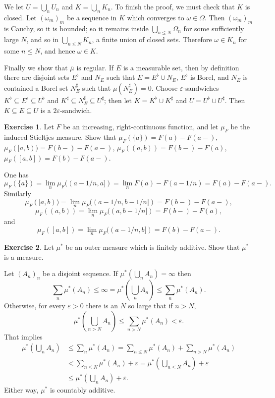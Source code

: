 \documentclass[10pt]{article}
\theoremstyle{definition}
\newtheorem{exer}{Exercise}
\begin{document}
We let $U = \bigcup_n U_n$ and $K = \bigcup_n K_n$. To finish the proof, we must check that $K$ is closed.
Let $(\omega_m)_m$ be a sequence in $K$ which converges to $\omega \in \Omega$.
Then $(\omega_m)_m$ is Cauchy, so it is bounded; so it remains inside $\bigcup_{n \leq N} \Omega_n$ for some sufficiently large $N$, and so in $\bigcup_{n \leq N} K_n$, a finite union of closed sets.
Therefore $\omega \in K_n$ for some $n \leq N$, and hence $\omega \in K$.

Finally we show that $\overline \mu$ is regular.
If $E$ is a measurable set, then by definition there are disjoint sets $E^\flat$ and $N_E$ such that $E = E^\flat \cup N_E$, $E^\flat$ is Borel, and $N_E$ is contained a Borel set $N_E^\sharp$ such that $\mu(N_E^\sharp) = 0$.
Choose $\varepsilon$-sandwiches $K^\flat \subseteq E^\flat \subseteq U^\flat$ and $K^\sharp \subseteq N_E^\sharp \subseteq U^\sharp$; then let $K = K^\flat \cup K^\sharp$ and $U = U^\flat \cup U^\sharp$.
Then $K \subseteq E \subseteq U$ is a $2\varepsilon$-sandwich.

\begin{exer}
Let $F$ be an increasing, right-continuous function, and let $\mu_F$ be the induced Stieltjes measure. Show that $\mu_F(\{a\}) = F(a) - F(a-)$, $\mu_F([a, b)) = F(b-) - F(a-)$, $\mu_F((a,b)) = F(b-) - F(a)$, $\mu_F([a,b]) = F(b) - F(a-)$.
\end{exer}

One has
$$\mu_F(\{a\}) = \lim_n \mu_F((a-1/n,a]) = \lim_n F(a) - F(a-1/n) = F(a) - F(a-).$$
Similarly
$$\mu_F([a, b)) = \lim_n \mu_F((a-1/n,b-1/n]) = F(b-) - F(a-),$$
$$\mu_F((a,b)) = \lim_n \mu_F((a, b-1/n]) = F(b-) - F(a),$$
and
$$\mu_F([a,b]) = \lim_n \mu_F((a-1/n,b]) = F(b) - F(a-).$$

\begin{exer}
Let $\mu^*$ be an outer measure which is finitely additive. Show that $\mu^*$ is a measure.
\end{exer}

Let $(A_n)_n$ be a disjoint sequence. If $\mu^*(\bigcup_n A_n) = \infty$ then
$$\sum_n \mu^*(A_n) \leq \infty = \mu^*\left(\bigcup_n A_n\right) \leq \sum_n \mu^*(A_n).$$
Otherwise, for every $\varepsilon > 0$ there is an $N$ so large that if $n > N$,
$$ \mu^*\left(\bigcup_{n > N} A_n \right) \leq \sum_{n > N} \mu^*(A_n) < \varepsilon.$$
That implies
\begin{align*}
 \mu^*\left(\bigcup_n A_n\right) &\leq \sum_n \mu^*(A_n) = \sum_{n \leq N} \mu^*(A_n) + \sum_{n > N} \mu^*(A_n)\\
 &< \sum_{n \leq N} \mu^*(A_n) + \varepsilon = \mu^*\left(\bigcup_{n \leq N} A_n\right) + \varepsilon\\
 &\leq \mu^*\left(\bigcup_n A_n\right) + \varepsilon.
\end{align*}
Either way, $\mu^*$ is countably additive.
\end{document}
